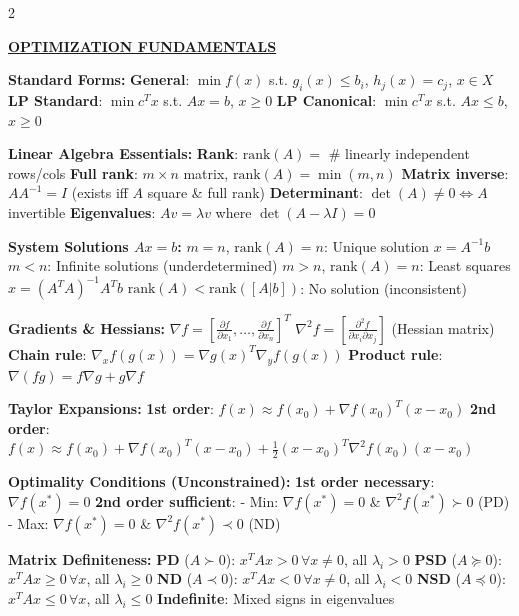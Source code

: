 \documentclass[8pt,a4paper,landscape]{article}
\newcommand{\mysection}[1]{\textbf{\underline{#1}}}
\newcommand{\mysubsection}[1]{\textbf{#1:}}
\begin{document}
\begin{multicols}{2}

\mysection{OPTIMIZATION FUNDAMENTALS}

\mysubsection{Standard Forms}
\textbf{General}: $\min f(x)$ s.t. $g_i(x) \leq b_i$, $h_j(x) = c_j$, $x \in X$
\textbf{LP Standard}: $\min c^Tx$ s.t. $Ax = b$, $x \geq 0$
\textbf{LP Canonical}: $\min c^Tx$ s.t. $Ax \leq b$, $x \geq 0$

\mysubsection{Linear Algebra Essentials}
\textbf{Rank}: $\text{rank}(A) = $ \# linearly independent rows/cols
\textbf{Full rank}: $m \times n$ matrix, $\text{rank}(A) = \min(m,n)$
\textbf{Matrix inverse}: $AA^{-1} = I$ (exists iff $A$ square \& full rank)
\textbf{Determinant}: $\det(A) \neq 0 \Leftrightarrow A$ invertible
\textbf{Eigenvalues}: $Av = \lambda v$ where $\det(A - \lambda I) = 0$

\mysubsection{System Solutions $Ax = b$}
$m = n$, $\text{rank}(A) = n$: Unique solution $x = A^{-1}b$
$m < n$: Infinite solutions (underdetermined)
$m > n$, $\text{rank}(A) = n$: Least squares $x = (A^TA)^{-1}A^Tb$
$\text{rank}(A) < \text{rank}([A|b])$: No solution (inconsistent)

\mysubsection{Gradients \& Hessians}
$\nabla f = [\frac{\partial f}{\partial x_1}, \ldots, \frac{\partial f}{\partial x_n}]^T$
$\nabla^2 f = [\frac{\partial^2 f}{\partial x_i \partial x_j}]$ (Hessian matrix)
\textbf{Chain rule}: $\nabla_x f(g(x)) = \nabla g(x)^T \nabla_y f(g(x))$
\textbf{Product rule}: $\nabla(fg) = f\nabla g + g\nabla f$

\mysubsection{Taylor Expansions}
\textbf{1st order}: $f(x) \approx f(x_0) + \nabla f(x_0)^T(x-x_0)$
\textbf{2nd order}: $f(x) \approx f(x_0) + \nabla f(x_0)^T(x-x_0) + \frac{1}{2}(x-x_0)^T\nabla^2f(x_0)(x-x_0)$

\mysubsection{Optimality Conditions (Unconstrained)}
\textbf{1st order necessary}: $\nabla f(x^*) = 0$
\textbf{2nd order sufficient}:
- Min: $\nabla f(x^*) = 0$ \& $\nabla^2 f(x^*) \succ 0$ (PD)
- Max: $\nabla f(x^*) = 0$ \& $\nabla^2 f(x^*) \prec 0$ (ND)

\mysubsection{Matrix Definiteness}
\textbf{PD} ($A \succ 0$): $x^TAx > 0 \, \forall x \neq 0$, all $\lambda_i > 0$
\textbf{PSD} ($A \succeq 0$): $x^TAx \geq 0 \, \forall x$, all $\lambda_i \geq 0$
\textbf{ND} ($A \prec 0$): $x^TAx < 0 \, \forall x \neq 0$, all $\lambda_i < 0$
\textbf{NSD} ($A \preceq 0$): $x^TAx \leq 0 \, \forall x$, all $\lambda_i \leq 0$
\textbf{Indefinite}: Mixed signs in eigenvalues


\end{multicols}
\end{document}
